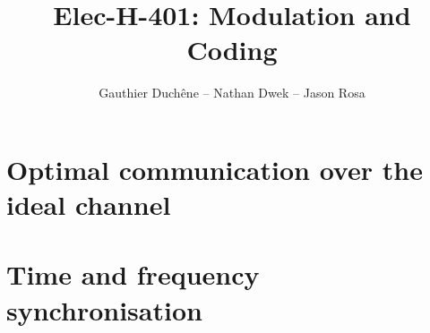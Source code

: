 

\title{Elec-H-401: Modulation and Coding}
\author{Gauthier Duchêne -- Nathan Dwek -- Jason Rosa}
\date{}


\maketitle
\tableofcontents
\clearpage
\hypersetup{allcolors = link}

\section{Optimal communication over the ideal channel}


\section{Time and frequency synchronisation}





